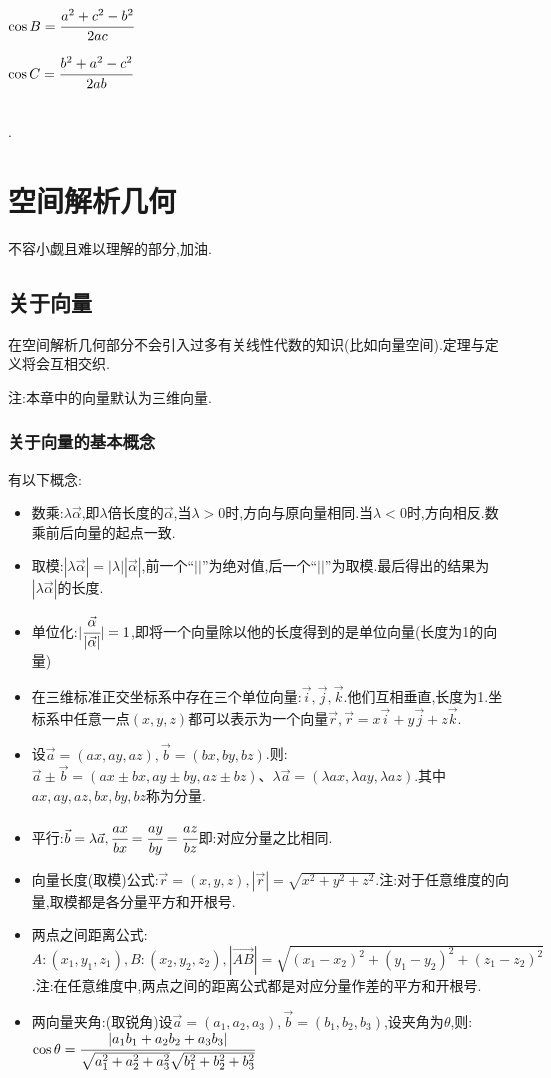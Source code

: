 \documentclass[UTF8,12pt]{ctexbook}
\begin{document}
{{{  $\cos B = \cfrac{a^2 + c^2 - b^2}{2ac}$

  $\cos C = \cfrac{b^2 + a^2 - c^2}{2ab}$
}%
\\

.

}%

\section{空间解析几何}{
  不容小觑且难以理解的部分,加油.

  \subsection{关于向量}{
    在空间解析几何部分不会引入过多有关线性代数的知识(比如向量空间).定理与定义将会互相交织.

    注:本章中的向量默认为三维向量.

    \subsubsection{关于向量的基本概念}{
      有以下概念:
      \begin{itemize}
        \item 数乘:$\lambda \vec{\alpha}$,即$\lambda$倍长度的$\vec{\alpha}$,当$\lambda > 0$时,方向与原向量相同.当$\lambda < 0$时,方向相反.数乘前后向量的起点一致.
        \item 取模:$|\lambda\vec{\alpha}| = |\lambda||\vec{\alpha}|$,前一个“$||$”为绝对值,后一个“$||$”为取模.最后得出的结果为$|\lambda\vec{\alpha}|$的长度.
        \item 单位化:$|\cfrac{\vec{\alpha}}{|\vec{\alpha}|}| = 1$,即将一个向量除以他的长度得到的是单位向量(长度为1的向量)
        \item 在三维标准正交坐标系中存在三个单位向量:$\vec{i},\vec{j},\vec{k}$.他们互相垂直,长度为1.坐标系中任意一点$(x,y,z)$都可以表示为一个向量$\vec{r},\vec{r} = x\vec{i} + y\vec{j} + z\vec{k}$.
        \item 设$\vec{a} = (ax,ay,az),\vec{b} = (bx,by,bz)$.则:$\vec{a} \pm \vec{b} = (ax \pm bx,ay \pm by,az \pm bz)$、$\lambda\vec{a} = (\lambda ax,\lambda ay,\lambda az)$.其中$ax,ay,az,bx,by,bz$称为分量.
        \item 平行:$\vec{b} = \lambda\vec{a},\cfrac{ax}{bx} = \cfrac{ay}{by} = \cfrac{az}{bz}$即:对应分量之比相同.
        \item 向量长度(取模)公式:$\vec{r} = (x,y,z),|\vec{r}| = \sqrt{x^2 + y^2 + z^2}$.注:对于任意维度的向量,取模都是各分量平方和开根号.
        \item 两点之间距离公式:$A:(x_1,y_1,z_1),B:(x_2,y_2,z_2),|\vec{AB}| = \sqrt{(x_1 - x_2)^2 + (y_1 -y_2)^2 + (z_1 - z_2)^2}$.注:在任意维度中,两点之间的距离公式都是对应分量作差的平方和开根号.
        \item {
              两向量夹角:(取锐角)设$\vec{a} = (a_1, a_2, a_3),\vec{b} = (b_1,b_2,b_3)$,设夹角为$\theta$,则:$\cos\theta = \cfrac{|a_1b_1 + a_2b_2 + a_3b_3|}{\sqrt{a_1^2 + a_2^2 + a_3^2}\sqrt{b_1^2 + b_2^2 + b_3^2}}$

}
\end{itemize}}}}}
\end{document}

